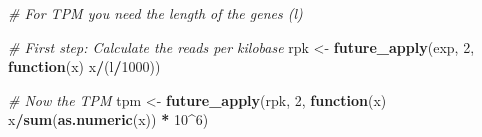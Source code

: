 \documentclass[]{book}
\newenvironment{Shaded}{\begin{snugshade}}{\end{snugshade}}
\newcommand{\CommentTok}[1]{\textcolor[rgb]{0.56,0.35,0.01}{\textit{#1}}}
\newcommand{\ControlFlowTok}[1]{\textcolor[rgb]{0.13,0.29,0.53}{\textbf{#1}}}
\newcommand{\DecValTok}[1]{\textcolor[rgb]{0.00,0.00,0.81}{#1}}
\newcommand{\KeywordTok}[1]{\textcolor[rgb]{0.13,0.29,0.53}{\textbf{#1}}}
\newcommand{\NormalTok}[1]{#1}
\newcommand{\OperatorTok}[1]{\textcolor[rgb]{0.81,0.36,0.00}{\textbf{#1}}}
\newcommand{\StringTok}[1]{\textcolor[rgb]{0.31,0.60,0.02}{#1}}
\begin{document}
\begin{Shaded}
\begin{Highlighting}[]
\CommentTok{# For TPM you need the length of the genes (l)}

\CommentTok{# First step: Calculate the reads per kilobase}
\NormalTok{rpk <-}\StringTok{ }\KeywordTok{future_apply}\NormalTok{(exp, }\DecValTok{2}\NormalTok{, }\ControlFlowTok{function}\NormalTok{(x) x}\OperatorTok{/}\NormalTok{(l}\OperatorTok{/}\DecValTok{1000}\NormalTok{))}

\CommentTok{# Now the TPM}
\NormalTok{tpm <-}\StringTok{ }\KeywordTok{future_apply}\NormalTok{(rpk, }\DecValTok{2}\NormalTok{, }\ControlFlowTok{function}\NormalTok{(x) x}\OperatorTok{/}\KeywordTok{sum}\NormalTok{(}\KeywordTok{as.numeric}\NormalTok{(x)) }\OperatorTok{*}\StringTok{ }
\StringTok{  }\DecValTok{10}\OperatorTok{^}\DecValTok{6}\NormalTok{)}


\end{Highlighting}
\end{Shaded}
\end{document}
